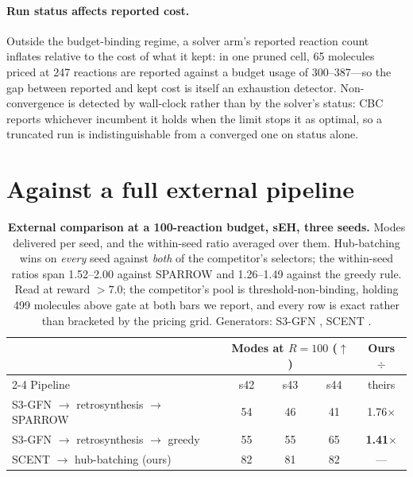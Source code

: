 \documentclass{article}
\newcommand{\checkval}[1]{#1}
\begin{document}
\paragraph{Run status affects reported cost.}
Outside the budget-binding regime, a solver arm's reported reaction count inflates relative to the cost of what it kept: in one pruned cell, \checkval{65} molecules priced at \checkval{247} reactions are reported against a budget usage of \checkval{300--387}---so the gap between reported and kept cost is itself an exhaustion detector. Non-convergence is detected by wall-clock rather than by the solver's status: CBC reports whichever incumbent it holds when the limit stops it as optimal, so a truncated run is indistinguishable from a converged one on status alone.


\section{Against a full external pipeline}
\label{app:external}
\begin{table}[t]
\centering
\caption{\textbf{External comparison at a 100-reaction budget, sEH, three seeds.} Modes
delivered per seed, and the within-seed ratio averaged over them. Hub-batching wins on
\emph{every} seed against \emph{both} of the competitor's selectors; the within-seed ratios
span \checkval{1.52--2.00} against SPARROW and \checkval{1.26--1.49} against the greedy
rule. Read at reward $>7.0$; the competitor's pool is threshold-non-binding, holding
\checkval{499} molecules above gate at both bars we report, and every row is exact rather
than bracketed by the pricing grid. Generators: S3-GFN \citep{kim2026s3gfn},
SCENT \citep{gainski2026scent}.}
\label{tab:external}
\small
\begin{tabular}{lcccc}
\toprule
 & \multicolumn{3}{c}{Modes at $R=100$ ($\uparrow$)} & Ours $\div$ \\
\cmidrule(lr){2-4}
Pipeline & s42 & s43 & s44 & theirs \\
\midrule
S3-GFN $\to$ retrosynthesis $\to$ SPARROW & 54 & 46 & 41 & 1.76$\times$ \\
S3-GFN $\to$ retrosynthesis $\to$ greedy & 55 & 55 & 65 & \textbf{1.41}$\times$ \\
SCENT $\to$ hub-batching (ours) & 82 & 81 & 82 & --- \\
\bottomrule
\end{tabular}
\end{table}
\end{document}
